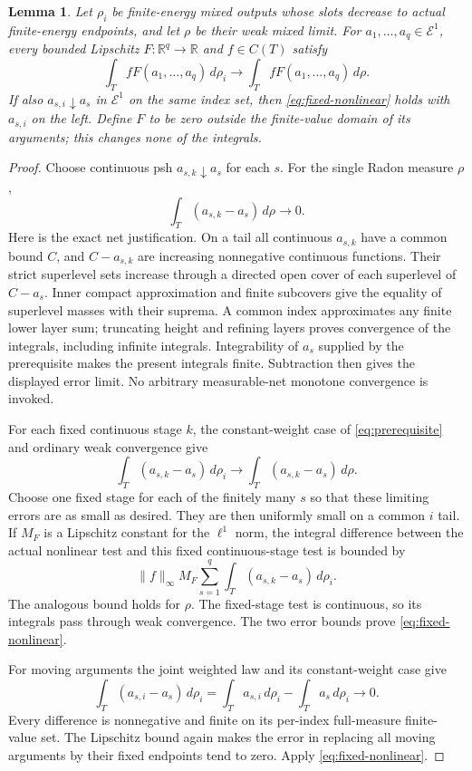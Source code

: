 \documentclass[11pt]{article}
\newtheorem{lemma}[theorem]{Lemma}
\newcommand{\E}{\mathcal E}
\begin{document}
\begin{lemma}\label{lem:lipschitz}
Let $\rho_i$ be finite-energy mixed outputs whose slots decrease
to actual finite-energy endpoints, and let $\rho$ be their weak
mixed limit. For $a_1,\ldots,a_q\in\E^1$, every bounded Lipschitz
$F:\mathbb R^q\to\mathbb R$ and $f\in C(T)$ satisfy
\begin{equation}\label{eq:fixed-nonlinear}
 \int_T fF(a_1,\ldots,a_q)\,d\rho_i
       \longrightarrow\int_T fF(a_1,\ldots,a_q)\,d\rho.
\end{equation}
If also $a_{s,i}\downarrow a_s$ in $\E^1$ on the same index set,
then \eqref{eq:fixed-nonlinear} holds with $a_{s,i}$ on the left.
Define $F$ to be zero outside the finite-value domain of its
arguments; this changes none of the integrals.
\end{lemma}
\begin{proof}
Choose continuous psh $a_{s,k}\downarrow a_s$ for each $s$.
For the single Radon measure $\rho$,
\[
               \int_T(a_{s,k}-a_s)\,d\rho\longrightarrow0.
\]
Here is the exact net justification. On a tail all continuous
$a_{s,k}$ have a common bound $C$, and $C-a_{s,k}$ are increasing
nonnegative continuous functions. Their strict superlevel sets
increase through a directed open cover of each superlevel of
$C-a_s$. Inner compact approximation and finite subcovers give
the equality of superlevel masses with their suprema. A common
index approximates any finite lower layer sum; truncating height
and refining layers proves convergence of the integrals, including
infinite integrals. Integrability of $a_s$ supplied by the
prerequisite makes the present integrals finite. Subtraction then
gives the displayed error limit. No arbitrary measurable-net
monotone convergence is invoked.

For each fixed continuous stage $k$, the constant-weight case of
\eqref{eq:prerequisite} and ordinary weak convergence give
\[
 \int_T(a_{s,k}-a_s)\,d\rho_i
          \longrightarrow\int_T(a_{s,k}-a_s)\,d\rho.
\]
Choose one fixed stage for each of the finitely many $s$ so that
these limiting errors are as small as desired. They are then
uniformly small on a common $i$ tail. If $M_F$ is a Lipschitz
constant for the $\ell^1$ norm, the integral difference between
the actual nonlinear test and this fixed continuous-stage test
is bounded by
\[
       \|f\|_\infty M_F
            \sum_{s=1}^q\int_T(a_{s,k}-a_s)\,d\rho_i.
\]
The analogous bound holds for $\rho$. The fixed-stage test is
continuous, so its integrals pass through weak convergence.
The two error bounds prove \eqref{eq:fixed-nonlinear}.

For moving arguments the joint weighted law and its constant-weight
case give
\[
 \int_T(a_{s,i}-a_s)\,d\rho_i
     =\int_Ta_{s,i}\,d\rho_i-\int_Ta_s\,d\rho_i
             \longrightarrow0.
\]
Every difference is nonnegative and finite on its per-index
full-measure finite-value set. The Lipschitz bound again makes
the error in replacing all moving arguments by their fixed
endpoints tend to zero. Apply \eqref{eq:fixed-nonlinear}.
\end{proof}
\end{document}
